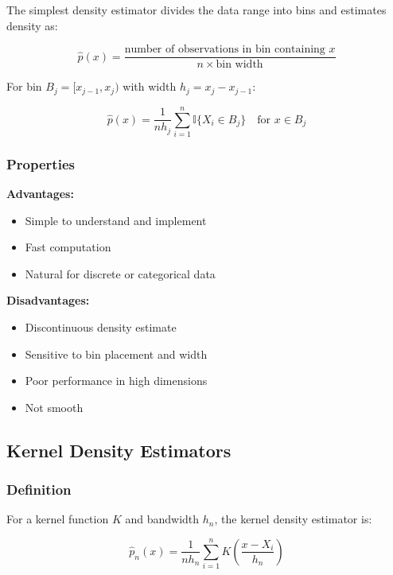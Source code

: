 \documentclass[12pt,a4paper]{article}
\begin{document}
The simplest density estimator divides the data range into bins and estimates density as:

\begin{equation}
\hat{p}(x) = \frac{\text{number of observations in bin containing } x}{n \times \text{bin width}}
\end{equation}

For bin $B_j = [x_{j-1}, x_j)$ with width $h_j = x_j - x_{j-1}$:

\begin{equation}
\hat{p}(x) = \frac{1}{nh_j} \sum_{i=1}^n \mathbb{I}\{X_i \in B_j\} \quad \text{for } x \in B_j
\end{equation}

\subsubsection{Properties}

\textbf{Advantages:}
\begin{itemize}
    \item Simple to understand and implement
    \item Fast computation
    \item Natural for discrete or categorical data
\end{itemize}

\textbf{Disadvantages:}
\begin{itemize}
    \item Discontinuous density estimate
    \item Sensitive to bin placement and width
    \item Poor performance in high dimensions
    \item Not smooth
\end{itemize}

\subsection{Kernel Density Estimators}

\subsubsection{Definition}

For a kernel function $K$ and bandwidth $h_n$, the kernel density estimator is:

\begin{equation}
\hat{p}_n(x) = \frac{1}{nh_n} \sum_{i=1}^n K\left(\frac{x - X_i}{h_n}\right)
\end{equation}
\end{document}
